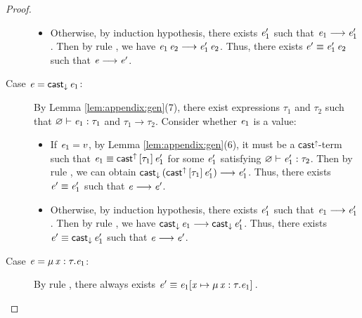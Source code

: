 \begin{proof}
\begin{description}
\begin{itemize}
    		    \item Otherwise, by induction hypothesis, there exists $\mathit{e'_{{\mathrm{1}}}}$ such
that $\mathit{e_{{\mathrm{1}}}}  \longrightarrow  \mathit{e'_{{\mathrm{1}}}}$. Then by rule , we have $\mathit{e_{{\mathrm{1}}}} \, \mathit{e_{{\mathrm{2}}}}  \longrightarrow  \mathit{e'_{{\mathrm{1}}}} \, \mathit{e_{{\mathrm{2}}}}$. Thus, there exists $\mathit{e'}  \equiv  \mathit{e'_{{\mathrm{1}}}} \, \mathit{e_{{\mathrm{2}}}}$ such that $\mathit{e}  \longrightarrow  \mathit{e'}$.
    		\end{itemize}
		\item[Case $\mathit{e}=\mathsf{cast}_{\downarrow} \, \mathit{e_{{\mathrm{1}}}}$:] By Lemma \ref{lem:appendix:gen}(7),
there exist expressions $\tau_{{\mathrm{1}}}$ and $\tau_{{\mathrm{2}}}$ such that $\varnothing  \vdash  \mathit{e_{{\mathrm{1}}}}  :  \tau_{{\mathrm{1}}}$ and
$\tau_{{\mathrm{1}}}  \longrightarrow  \tau_{{\mathrm{2}}}$. Consider whether $\mathit{e_{{\mathrm{1}}}}$ is a value:
		     \begin{itemize}
    		    \item If $\mathit{e_{{\mathrm{1}}}}=v$, by Lemma \ref{lem:appendix:gen}(6), it must be a
$ \mathsf{cast}^{\uparrow} $-term such that $\mathit{e_{{\mathrm{1}}}}  \equiv  \mathsf{cast}^{\uparrow} \, [  \tau_{{\mathrm{1}}}  ] \,  \mathit{e'_{{\mathrm{1}}}}$ for some $\mathit{e'_{{\mathrm{1}}}}$
satisfying $\varnothing  \vdash  \mathit{e'_{{\mathrm{1}}}}  :  \tau_{{\mathrm{2}}}$. Then by rule , we can obtain
$\mathsf{cast}_{\downarrow} \, (  \mathsf{cast}^{\uparrow} \, [  \tau_{{\mathrm{1}}}  ] \,  \mathit{e'_{{\mathrm{1}}}}  )  \longrightarrow  \mathit{e'_{{\mathrm{1}}}}$. Thus, there exists $\mathit{e'}  \equiv  \mathit{e'_{{\mathrm{1}}}}$
such that $\mathit{e}  \longrightarrow  \mathit{e'}$.
    		    \item Otherwise, by induction hypothesis, there exists $\mathit{e'_{{\mathrm{1}}}}$ such
that $\mathit{e_{{\mathrm{1}}}}  \longrightarrow  \mathit{e'_{{\mathrm{1}}}}$. Then by rule , we have $\mathsf{cast}_{\downarrow} \, \mathit{e_{{\mathrm{1}}}}  \longrightarrow  \mathsf{cast}_{\downarrow} \, \mathit{e'_{{\mathrm{1}}}}$. Thus, there exists $\mathit{e'}  \equiv  \mathsf{cast}_{\downarrow} \, \mathit{e'_{{\mathrm{1}}}}$ such that
$\mathit{e}  \longrightarrow  \mathit{e'}$.
    		\end{itemize}
		\item[Case $\mathit{e}=\mu \, \mathit{x}  :  \tau  .  \mathit{e_{{\mathrm{1}}}}$:] By rule , there always
exists $\mathit{e'}  \equiv  \mathit{e_{{\mathrm{1}}}}  [  \mathit{x}  \mapsto  \mu \, \mathit{x}  :  \tau  .  \mathit{e_{{\mathrm{1}}}}  ] \,$.
    \end{description}
\end{proof}

